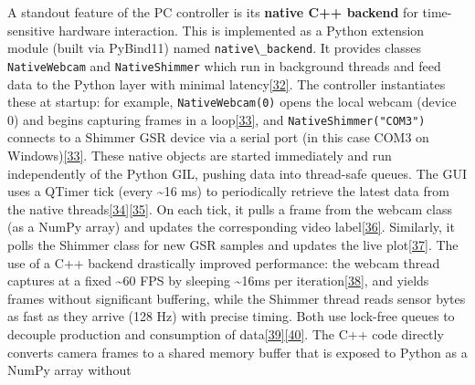 \documentclass[12pt,a4paper]{article}
\begin{document}
A standout feature of the PC controller is its \textbf{native C++ backend} for time-sensitive hardware interaction. This is implemented as a Python extension module (built via PyBind11) named \passthrough{\lstinline!native\_backend!}. It provides classes \passthrough{\lstinline!NativeWebcam!} and \passthrough{\lstinline!NativeShimmer!} which run in background threads and feed data to the Python layer with minimal latency\href{https://github.com/buccancs/GSR-Dual-Video-System/blob/05ae360cb7b4ae7c7861f72deb235ad64a74b38e/pc_controller/src/main/main.py\#L126-L135}{{[}32{]}}. The controller instantiates these at startup: for example, \passthrough{\lstinline!NativeWebcam(0)!} opens the local webcam (device 0) and begins capturing frames in a loop\href{https://github.com/buccancs/GSR-Dual-Video-System/blob/05ae360cb7b4ae7c7861f72deb235ad64a74b38e/pc_controller/src/main/main.py\#L126-L134}{{[}33{]}}, and \passthrough{\lstinline!NativeShimmer("COM3")!} connects to a Shimmer GSR device via a serial port (in this case COM3 on Windows)\href{https://github.com/buccancs/GSR-Dual-Video-System/blob/05ae360cb7b4ae7c7861f72deb235ad64a74b38e/pc_controller/src/main/main.py\#L126-L134}{{[}33{]}}. These native objects are started immediately and run independently of the Python GIL, pushing data into thread-safe queues. The GUI uses a QTimer tick (every \textasciitilde16 ms) to periodically retrieve the latest data from the native threads\href{https://github.com/buccancs/GSR-Dual-Video-System/blob/05ae360cb7b4ae7c7861f72deb235ad64a74b38e/pc_controller/src/main/main.py\#L132-L140}{{[}34{]}}\href{https://github.com/buccancs/GSR-Dual-Video-System/blob/05ae360cb7b4ae7c7861f72deb235ad64a74b38e/pc_controller/src/main/main.py\#L150-L159}{{[}35{]}}. On each tick, it pulls a frame from the webcam class (as a NumPy array) and updates the corresponding video label\href{https://github.com/buccancs/GSR-Dual-Video-System/blob/05ae360cb7b4ae7c7861f72deb235ad64a74b38e/pc_controller/src/main/main.py\#L150-L158}{{[}36{]}}. Similarly, it polls the Shimmer class for new GSR samples and updates the live plot\href{https://github.com/buccancs/GSR-Dual-Video-System/blob/05ae360cb7b4ae7c7861f72deb235ad64a74b38e/pc_controller/src/main/main.py\#L154-L159}{{[}37{]}}. The use of a C++ backend drastically improved performance: the webcam thread captures at a fixed \textasciitilde60 FPS by sleeping \textasciitilde16ms per iteration\href{https://github.com/buccancs/GSR-Dual-Video-System/blob/05ae360cb7b4ae7c7861f72deb235ad64a74b38e/pc_controller/src/cpp_backend/native_backend.cpp\#L80-L88}{{[}38{]}}, and yields frames without significant buffering, while the Shimmer thread reads sensor bytes as fast as they arrive (128 Hz) with precise timing. Both use lock-free queues to decouple production and consumption of data\href{https://github.com/buccancs/GSR-Dual-Video-System/blob/05ae360cb7b4ae7c7861f72deb235ad64a74b38e/pc_controller/src/cpp_backend/native_backend.cpp\#L22-L31}{{[}39{]}}\href{https://github.com/buccancs/GSR-Dual-Video-System/blob/05ae360cb7b4ae7c7861f72deb235ad64a74b38e/pc_controller/src/cpp_backend/native_backend.cpp\#L94-L101}{{[}40{]}}. The C++ code directly converts camera frames to a shared memory buffer that is exposed to Python as a NumPy array without 
\end{document}
